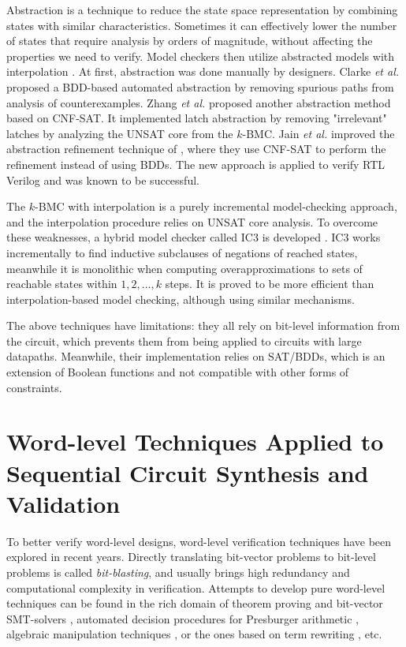 Abstraction is a technique to reduce the state space representation by combining states with similar 
characteristics. Sometimes it can effectively lower the number of states that require analysis by orders of magnitude,
without affecting the properties we need to verify. Model checkers then utilize abstracted models 
with interpolation \cite{mcmillan2003interpolation,mcmillan:cav06}.
At first, abstraction was done manually by designers. Clarke {\it et al.} \cite{clarke2000counterexample}
proposed a BDD-based automated abstraction by removing spurious paths from analysis of counterexamples. 
Zhang {\it et al.} \cite{zhang2005design} proposed another abstraction method based on CNF-SAT.
It implemented latch abstraction by removing "irrelevant" latches by analyzing the 
UNSAT core from the $k$-BMC. Jain {\it et al.} \cite{jain2005word} improved the abstraction refinement technique of \cite{clarke2000counterexample},
where they use CNF-SAT to perform the refinement instead of using BDDs. The new approach is applied to verify RTL Verilog
and was known to be successful.

The $k$-BMC with interpolation is a purely incremental model-checking approach, and the interpolation procedure relies
on UNSAT core analysis. To overcome these weaknesses, a hybrid model checker called IC3 is developed 
\cite{bradley2011sat,bradley2011incremental}. IC3 works incrementally to find inductive subclauses
of negations of reached states, meanwhile it is monolithic when computing overapproximations to sets of reachable
states within $1,2,\dots,k$ steps. It is proved to be more efficient than interpolation-based model checking,
although using similar mechanisms.

The above techniques have limitations: they all rely on bit-level information from 
the circuit, which prevents them from being applied to circuits with large datapaths.
Meanwhile, their implementation relies on SAT/BDDs, which is an extension of Boolean 
functions and not compatible with other forms of constraints.

\section{Word-level Techniques Applied to Sequential Circuit Synthesis and Validation}
To better verify word-level designs, word-level verification techniques have been 
explored in recent years. Directly translating bit-vector problems to bit-level 
problems is called {\it bit-blasting}, and usually brings high redundancy and computational complexity in verification.
Attempts to develop pure word-level techniques can be found in
the rich domain of 
theorem proving \cite{arditi:bmd} and bit-vector SMT-solvers
\cite{boolector,cvc3,z3,bitvector98}, automated
decision procedures for Presburger arithmetic \cite{presburger,bultan:mixed_verification}, 
algebraic manipulation techniques 
\cite{devadas:algebraic_manipulation_iccd91}, or the ones based on
term rewriting \cite{AST}, etc.

